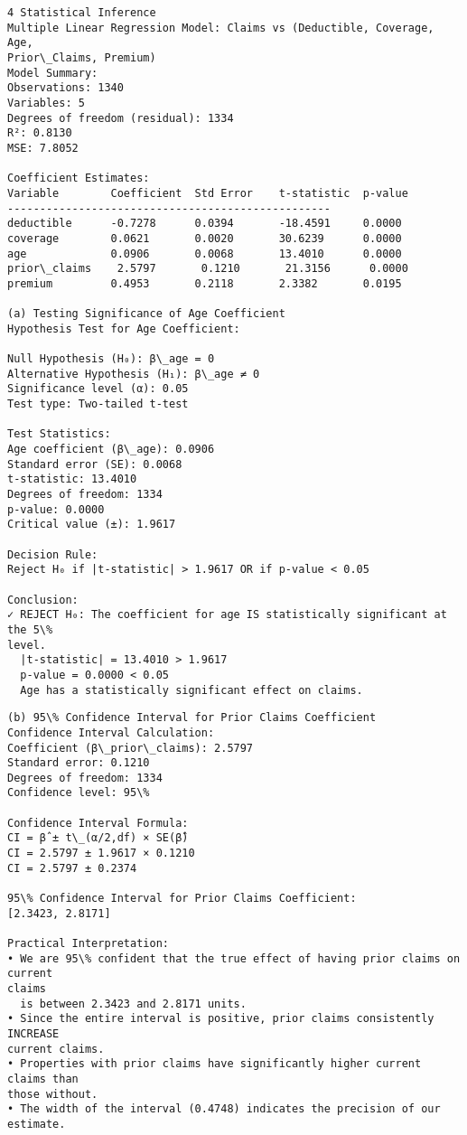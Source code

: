 \documentclass[8pt, twocolumn]{extarticle}
\begin{document}
    \begin{Verbatim}[commandchars=\\\{\}]
4 Statistical Inference
Multiple Linear Regression Model: Claims vs (Deductible, Coverage, Age,
Prior\_Claims, Premium)
Model Summary:
Observations: 1340
Variables: 5
Degrees of freedom (residual): 1334
R²: 0.8130
MSE: 7.8052

Coefficient Estimates:
Variable        Coefficient  Std Error    t-statistic  p-value
--------------------------------------------------
deductible      -0.7278      0.0394       -18.4591     0.0000
coverage        0.0621       0.0020       30.6239      0.0000
age             0.0906       0.0068       13.4010      0.0000
prior\_claims    2.5797       0.1210       21.3156      0.0000
premium         0.4953       0.2118       2.3382       0.0195

(a) Testing Significance of Age Coefficient
Hypothesis Test for Age Coefficient:

Null Hypothesis (H₀): β\_age = 0
Alternative Hypothesis (H₁): β\_age ≠ 0
Significance level (α): 0.05
Test type: Two-tailed t-test

Test Statistics:
Age coefficient (β\_age): 0.0906
Standard error (SE): 0.0068
t-statistic: 13.4010
Degrees of freedom: 1334
p-value: 0.0000
Critical value (±): 1.9617

Decision Rule:
Reject H₀ if |t-statistic| > 1.9617 OR if p-value < 0.05

Conclusion:
✓ REJECT H₀: The coefficient for age IS statistically significant at the 5\%
level.
  |t-statistic| = 13.4010 > 1.9617
  p-value = 0.0000 < 0.05
  Age has a statistically significant effect on claims.
    \end{Verbatim}
    \begin{Verbatim}[commandchars=\\\{\}]
(b) 95\% Confidence Interval for Prior Claims Coefficient
Confidence Interval Calculation:
Coefficient (β\_prior\_claims): 2.5797
Standard error: 0.1210
Degrees of freedom: 1334
Confidence level: 95\%

Confidence Interval Formula:
CI = β̂ ± t\_(α/2,df) × SE(β̂)
CI = 2.5797 ± 1.9617 × 0.1210
CI = 2.5797 ± 0.2374

95\% Confidence Interval for Prior Claims Coefficient:
[2.3423, 2.8171]

Practical Interpretation:
• We are 95\% confident that the true effect of having prior claims on current
claims
  is between 2.3423 and 2.8171 units.
• Since the entire interval is positive, prior claims consistently INCREASE
current claims.
• Properties with prior claims have significantly higher current claims than
those without.
• The width of the interval (0.4748) indicates the precision of our estimate.
    \end{Verbatim}
\end{document}
